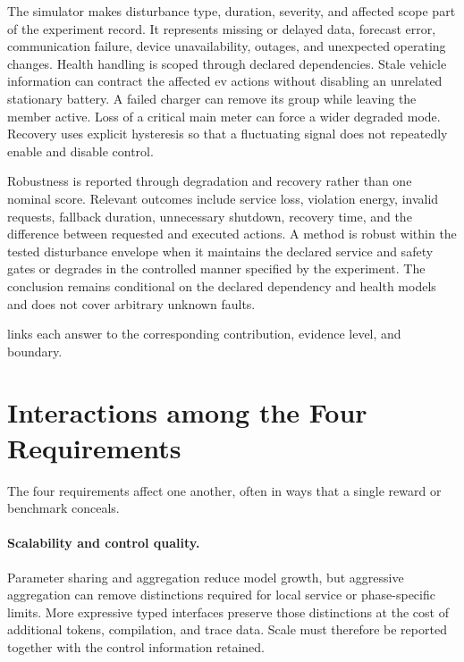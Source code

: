 The simulator makes disturbance type, duration, severity, and affected scope part of the experiment record. It represents missing or delayed data, forecast error, communication failure, device unavailability, outages, and unexpected operating changes. Health handling is scoped through declared dependencies. Stale vehicle information can contract the affected \gls{ev} actions without disabling an unrelated stationary battery. A failed charger can remove its group while leaving the member active. Loss of a critical main meter can force a wider degraded mode. Recovery uses explicit hysteresis so that a fluctuating signal does not repeatedly enable and disable control.

Robustness is reported through degradation and recovery rather than one nominal score. Relevant outcomes include service loss, violation energy, invalid requests, fallback duration, unnecessary shutdown, recovery time, and the difference between requested and executed actions. A method is robust within the tested disturbance envelope when it maintains the declared service and safety gates or degrades in the controlled manner specified by the experiment. The conclusion remains conditional on the declared dependency and health models and does not cover arbitrary unknown faults.

 links each answer to the corresponding contribution, evidence level, and boundary.


\section{Interactions among the Four Requirements}
\label{sec:discussion-interactions}
\label{sec:discussion-tradeoffs}

The four requirements affect one another, often in ways that a single reward or benchmark conceals.

\paragraph{Scalability and control quality.}
Parameter sharing and aggregation reduce model growth, but aggressive aggregation can remove distinctions required for local service or phase-specific limits. More expressive typed interfaces preserve those distinctions at the cost of additional tokens, compilation, and trace data. Scale must therefore be reported together with the control information retained.

